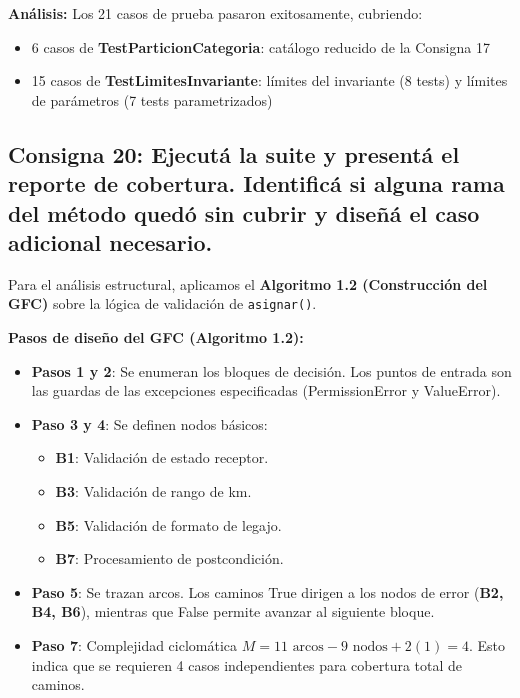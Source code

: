 \textbf{Análisis:} Los 21 casos de prueba pasaron exitosamente, cubriendo:
\begin{itemize}
    \item 6 casos de \textbf{TestParticionCategoria}: catálogo reducido de la Consigna 17
    \item 15 casos de \textbf{TestLimitesInvariante}: límites del invariante (8 tests) y límites de parámetros (7 tests parametrizados)
\end{itemize}

\subsection{Consigna 20: Ejecutá la suite y presentá el reporte de cobertura. Identificá si alguna rama del método quedó sin cubrir y diseñá el caso adicional necesario.}

Para el análisis estructural, aplicamos el \textbf{Algoritmo 1.2 (Construcción del GFC)} sobre la lógica de validación de \texttt{asignar()}.

\textbf{Pasos de diseño del GFC (Algoritmo 1.2):}
\begin{itemize}
    \item \textbf{Pasos 1 y 2}: Se enumeran los bloques de decisión. Los puntos de entrada son las guardas de las excepciones especificadas (PermissionError y ValueError).
    \item \textbf{Paso 3 y 4}: Se definen nodos básicos:
    \begin{itemize}
        \item \textbf{B1}: Validación de estado receptor.
        \item \textbf{B3}: Validación de rango de km.
        \item \textbf{B5}: Validación de formato de legajo.
        \item \textbf{B7}: Procesamiento de postcondición.
    \end{itemize}
    \item \textbf{Paso 5}: Se trazan arcos. Los caminos True dirigen a los nodos de error (\textbf{B2, B4, B6}), mientras que False permite avanzar al siguiente bloque.
    \item \textbf{Paso 7}: Complejidad ciclomática $M = 11 \text{ arcos} - 9 \text{ nodos} + 2(1) = 4$. Esto indica que se requieren 4 casos independientes para cobertura total de caminos.
\end{itemize}

